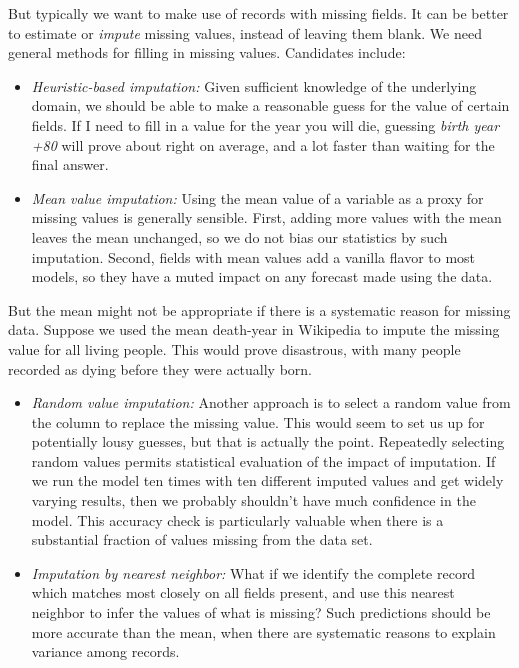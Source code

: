 \documentclass[10pt]{article}
\begin{document}
But typically we want to make use of records with missing fields. It can be better to estimate or \emph{impute} missing values, instead of leaving them blank. We need general methods for filling in missing values. Candidates include:

\begin{itemize}
  \item \emph{Heuristic-based imputation:} Given sufficient knowledge of the underlying domain, we should be able to make a reasonable guess for the value of certain fields. If I need to fill in a value for the year you will die, guessing \emph{birth year +80} will prove about right on average, and a lot faster than waiting for the final answer.
  \item \emph{Mean value imputation:} Using the mean value of a variable as a proxy for missing values is generally sensible. First, adding more values with the mean leaves the mean unchanged, so we do not bias our statistics by such imputation. Second, fields with mean values add a vanilla flavor to most models, so they have a muted impact on any forecast made using the data.
\end{itemize}

But the mean might not be appropriate if there is a systematic reason for missing data. Suppose we used the mean death-year in Wikipedia to impute the missing value for all living people. This would prove disastrous, with many people recorded as dying before they were actually born.

\begin{itemize}
  \item \emph{Random value imputation:} Another approach is to select a random value from the column to replace the missing value. This would seem to set us up for potentially lousy guesses, but that is actually the point. Repeatedly selecting random values permits statistical evaluation of the impact of imputation. If we run the model ten times with ten different imputed values and get widely varying results, then we probably shouldn't have much confidence in the model. This accuracy check is particularly valuable when there is a substantial fraction of values missing from the data set.
  \item \emph{Imputation by nearest neighbor:} What if we identify the complete record which matches most closely on all fields present, and use this nearest neighbor to infer the values of what is missing? Such predictions should be more accurate than the mean, when there are systematic reasons to explain variance among records.
\end{itemize}
\end{document}
